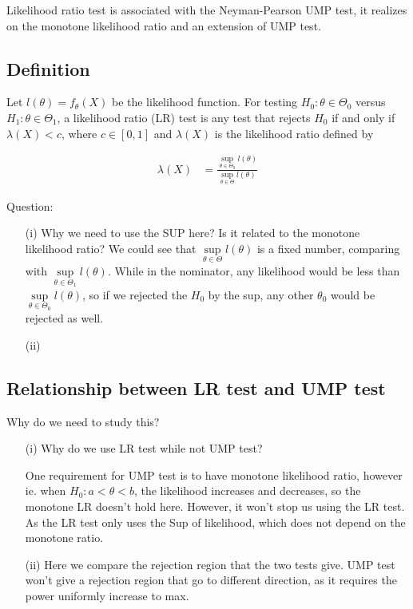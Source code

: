 Likelihood ratio test is associated with the Neyman-Pearson UMP test, it realizes on the monotone likelihood ratio and an extension of UMP test. 

\subsection{Definition}
Let $l(\theta) = f_{\theta}(X)$ be the likelihood function. For testing $H_0: \theta \in \Theta_0$ versus $H_1: \theta \in \Theta_1$, a likelihood ratio (LR) test is any test that rejects $H_0$
if and only if $\lambda(X) < c$, where $c \in [0,1]$ and $\lambda(X)$ is the likelihood ratio defined by

\begin{align*}
	\lambda(X) &= \frac{ \underset{\theta \in \Theta_0}{\sup} l(\theta)}{\underset{\theta \in \Theta}{\sup} l(\theta)}
\end{align*}

Question:

\begin{itemize}
	\item [(i)] Why we need to use the SUP here? Is it related to the monotone likelihood ratio?
	We could see that $\underset{\theta \in \Theta}{\sup} l(\theta)$ is a fixed number, comparing with $\underset{\theta \in \Theta_1}{\sup} l(\theta)$. While in the nominator, any likelihood would be less than $\underset{\theta \in \Theta_0}{\sup} l(\theta)$, so if we rejected the $H_0$ by the sup, any other $\theta_0$ would be rejected as well. 
	
	
	\item[(ii)]

\end{itemize}


\subsection{Relationship between LR test and UMP test}

Why do we need to study this?
\begin{itemize}
	\item [(i)] Why do we use LR test while not UMP test?
	
	One requirement for UMP test is to have monotone likelihood ratio, however ie. when $H_0: a < \theta <b$, the likelihood increases and decreases, so the monotone LR doesn't hold here. However, it won't stop us using the LR test. 
	As the LR test only uses the Sup of likelihood, which does not depend on the monotone ratio.
	
	\item[(ii)] Here we compare the rejection region that the two tests give. UMP test won't give a rejection region that go to different direction, as it requires the power uniformly increase to max. 

\end{itemize}
	

